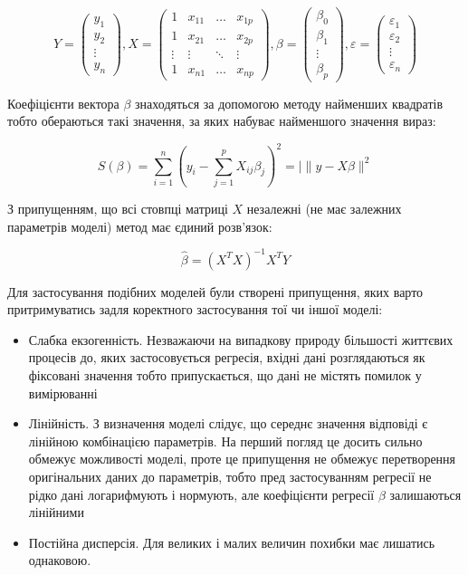 $$
Y = \begin{pmatrix}
        y_1 \\
        y_2 \\
        \vdots \\
        y_n
    \end{pmatrix}, 
X = \begin{pmatrix}
        1 & x_{1 1} & \dots & x_{1 p}\\
        1 & x_{2 1} & \dots & x_{2 p}\\
        \vdots & \vdots & \ddots & \vdots \\
        1 & x_{n 1} & \dots & x_{n p}
    \end{pmatrix}, 
\beta = \begin{pmatrix}
            \beta_0 \\
            \beta_1 \\ 
            \vdots \\
            \beta_p
        \end{pmatrix}, 
\varepsilon =   \begin{pmatrix}
                    \varepsilon_1 \\
                    \varepsilon_2 \\
                    \vdots \\
                    \varepsilon_n 
                \end{pmatrix}
$$

Коефіцієнти вектора $\beta$ знаходяться за допомогою методу найменших квадратів тобто обераються такі значення, за яких набуває найменшого значення вираз: 

$$ S(\beta) = \sum_{i = 1}^{n} ( y_i - \sum_{j = 1}^{p} X_{ij} \beta_j )^2 = |\| y - X\beta \|^2 $$

З припущенням, що всі стовпці матриці $X$ незалежні (не має залежних параметрів моделі) метод має єдиний розв'язок:

$$\hat{\beta} = (X^T X)^{-1} X^T Y$$

Для застосування подібних моделей були створені припущення, яких варто притримуватись задля коректного застосування тої чи іншої моделі:

\begin{itemize}
    \item Слабка екзогенність. Незважаючи на випадкову природу більшості життєвих процесів до, яких застосовується регресія, вхідні дані розглядаються як фіксовані значення тобто припускається, що дані не містять помилок у вимірюванні

    \item Лінійність. З визначення моделі слідує, що середнє значення відповіді є лінійною комбінацією параметрів. На перший погляд це досить сильно обмежує можливості моделі, проте це припущення не обмежує перетворення оригінальних даних до параметрів, тобто пред застосуванням регресії не рідко дані логарифмують і нормують, але коефіцієнти регресії $\beta$ залишаються лінійними

    \item  Постійна дисперсія. Для великих і малих величин похибки має лишатись однаковою.
\end{itemize}

